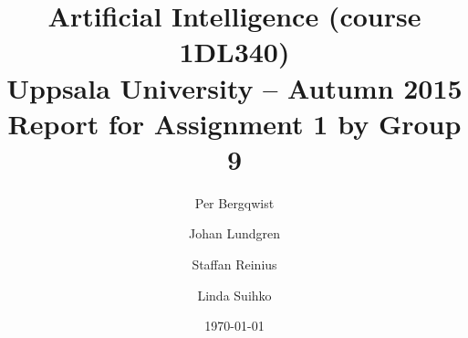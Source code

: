 \documentclass[a4paper,11pt]{article}
\title{\textbf{Artificial Intelligence (course 1DL340) \\
    Uppsala University -- Autumn 2015 \\
    Report for Assignment 1 by Group 9}}
\author{Per Bergqwist \and Johan Lundgren \and
Staffan Reinius \and Linda Suihko}
\date{\today}
\begin{document}
\maketitle
\section{}
\end{document}
